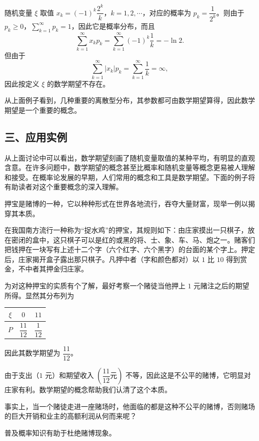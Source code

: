 \documentclass[../../main.tex]{subfiles}
\begin{document}
\begin{example}[期望不存在的离散分布]\label{example:ch04-期望不存在}
随机变量 $\xi$ 取值 $x_k=(-1)^k\dfrac{2^k}{k}$，$k=1,2,\cdots$，对应的概率为 $p_k=\dfrac{1}{2^k}$。则由于 $p_k\geqslant 0$，$\sum_{k=1}^{\infty}p_k=1$，因此它是概率分布，而且
\[
\sum_{k=1}^{\infty} x_k p_k=\sum_{k=1}^{\infty}(-1)^k\frac{1}{k}=-\ln 2.
\]
但由于
\[
\sum_{k=1}^{\infty}|x_k|p_k=\sum_{k=1}^{\infty}\frac{1}{k}=\infty,
\]
因此按定义 $\xi$ 的数学期望不存在。
\end{example}

从上面例子看到，几种重要的离散型分布，其参数都可由数学期望算得，因此数学期望是一个重要的概念。

\subsection*{三、应用实例}

从上面讨论中可以看出，数学期望刻画了随机变量取值的某种平均，有明显的直观含意。在许多问题中，数学期望的概念甚至比概率和随机变量等概念更易被人理解和接受。在概率论发展的早期，人们常用的概念和工具是数学期望。下面的例子将有助读者对这个重要概念的深入理解。

\begin{example}[押宝]\label{example:ch04-押宝}
押宝是赌博的一种，它以种种形式在世界各地流行，吞夺大量财富，现举一例以揭穿其本质。

在我国南方流行一种称为``捉水鸡''的押宝，其规则如下：由庄家摸出一只棋子，放在密闭的盒中，这只棋子可以是红的或黑的将、士、象、车、马、炮之一。赌客们把钱押在一块写有上述十二个字（六个红字、六个黑字）的台面的某个字上。押定后，庄家揭开盒子露出那只棋子。凡押中者（字和颜色都对）以 $1$ 比 $10$ 得到赏金，不中者其押金归庄家。

为对这种押宝的实质有个了解，最好考察一个赌徒当他押上 $1$ 元赌注之后的期望所得。显然其分布列为
\begin{center}
\begin{tabular}{c|cc}
$\xi$ & $0$ & $11$\\
\hline
$P$ & $\dfrac{11}{12}$ & $\dfrac{1}{12}$
\end{tabular}
\end{center}
因此其数学期望为 $\dfrac{11}{12}$。

由于支出（$1$ 元）和期望收入 $\left(\dfrac{11}{12}\text{元}\right)$ 不等，因此这是不公平的赌博，它明显对庄家有利。数学期望的概念帮助我们认清了这个本质。

事实上，当一个赌徒走进一座赌场时，他面临的都是这种不公平的赌博，否则赌场的巨大开销和业主的高额利润从何而来呢？

普及概率知识有助于杜绝赌博现象。
\end{example}
\end{document}
